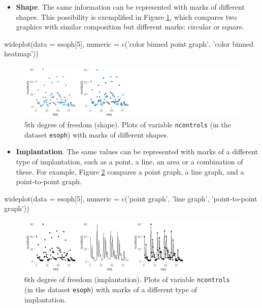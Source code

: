 \begin{itemize}
	\tightlist
	\item
	\textbf{Shape}. The same information can be represented with marks of
	different shapes. This possibility is exemplified in Figure
	\ref{fig:dg4}, which compares two graphics with similar composition
	but different marks: circular or square.
\end{itemize}

\begin{example}
  wideplot(data = esoph[5], 
           numeric = c('color binned point graph', 'color binned heatmap'))
\end{example}


\begin{Schunk}
	\begin{figure}[H]
\includegraphics[width=1\linewidth]{figures/dg4-1} \caption[5th deg]{5th degree of freedom (shape). Plots of variable \texttt{ncontrols} (in the dataset \texttt{esoph}) with marks of different shapes.}\label{fig:dg4}
	\end{figure}
\end{Schunk}

\begin{itemize}
	\tightlist
	\item
	\textbf{Implantation}. The same values can be represented with marks
	of a different type of implantation, such as a point, a line, an area
	or a combination of these. For example, Figure \ref{fig:dg5} compares
	a point graph, a line graph, and a point-to-point graph.
\end{itemize}

\begin{example}
  wideplot(data = esoph[5], 
           numeric = c('point graph', 'line graph', 'point-to-point graph'))
\end{example}

\begin{Schunk}
	\begin{figure}[H]
\includegraphics[width=1\linewidth]{figures/dg5-1} \caption[6th deg]{6th degree of freedom (implantation). Plots of variable \texttt{ncontrols} (in the dataset \texttt{esoph}) with marks of a different type of implantation.}\label{fig:dg5}
	\end{figure}
\end{Schunk}

